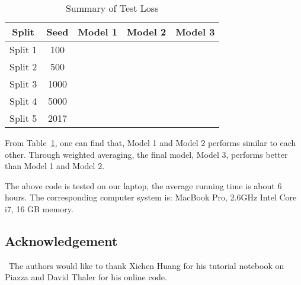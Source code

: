 \documentclass[12pt]{article}
\begin{document}
\begin{table}[htb]
 \caption{Summary of Test Loss} \label{result}
 \vspace{0.1in}
\begin{center}
  \begin{tabular}{  c  c  c  c  c}
    \hline
    Split            & Seed        & Model 1    & Model 2    & Model 3 \\ \hline
    Split 1         & 100    \\ \hline
    Split 2         & 500    \\ \hline
    Split 3         & 1000    \\ \hline
    Split 4         & 5000    \\ \hline
    Split 5         & 2017    \\ \hline
  \end{tabular}
\end{center}
\end{table}


From Table~\ref{result}, one can find that, Model 1 and Model 2 performs similar to each other. Through weighted averaging, the final model, Model 3, performs better than Model 1 and Model 2.

The above code is tested on our laptop, the average running time is about 6 hours. The corresponding computer system is:
MacBook Pro, 2.6GHz Intel Core i7, 16 GB memory.  

\subsection*{Acknowledgement}


\quad\ The authors would like to thank Xichen Huang for his tutorial notebook on Piazza and David Thaler for his online code.

\vfill\pagebreak

%
\end{document}
